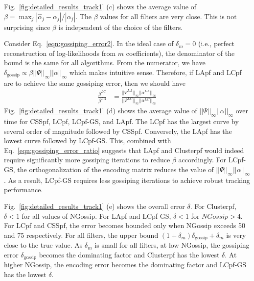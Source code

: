 \documentclass[10pt,letterpaper,final]{article}
\begin{document}
Fig.~\ref{fig:detailed_results_track1} (c) shows the average value of $\beta = \max_j|\hat{\alpha}_j-\alpha_j|/|\alpha_j|$. The $\beta$ values for all filters are very close. This is not surprising since $\beta$ is independent of the choice of the filters. 


Consider Eq.~\eqref{eqn:gossiping_error2}. In the ideal case of $\delta_m=0$ (i.e., perfect reconstruction of log-likelihoods from $m$ coefficients), the denominator of the bound is the same for all algorithms. From the numerator, we have $\delta_{\text{gossip}}\propto \beta||\Psi||_\infty||\alpha||_\infty$ which makes intuitive sense. Therefore, if LApf and LCpf are to achieve the same gossiping error, then we should have
\begin{align}
\frac{\beta^{LC}}{\beta^{LA}} &= \frac{||\Psi^{LA}||_\infty||\alpha^{LA}||_\infty}{||\Psi^{LC}||_\infty||\alpha^{LC}||_\infty}
\label{eqn:gossiping_error_ratio}
\end{align}
Fig.~\ref{fig:detailed_results_track1} (d) shows the average value of $||\Psi||_\infty||\alpha||_\infty$ over time for CSSpf, LCpf, LCpf-GS, and LApf. The LCpf has the largest curve by several order of magnitude followed by CSSpf. Conversely, the LApf has the lowest curve followed by LCpf-GS. This, combined with Eq.~\eqref{eqn:gossiping_error_ratio} suggests that LApf and Clusterpf would indeed require significantly more gossiping iterations to reduce $\beta$ accordingly. For LCpf-GS, the orthogonalization of the encoding matrix reduces the value of $||\Psi||_\infty||\alpha||_\infty$. As a result, LCpf-GS requires less gossiping iterations to achieve robust tracking performance. 

Fig.~\ref{fig:detailed_results_track1} (e) shows the overall error $\delta$. For Clusterpf, $\delta<1$ for all values of NGossip. For LApf and LCpf-GS, $\delta<1$ for $NGossip>4$. For LCpf and CSSpf, the error becomes bounded only when NGossip exceeds 50 and 75 respectively. For all filters, the upper bound $(1+\delta_m)\delta_{\text{gossip}}+\delta_m$ is very close to the true value. As $\delta_m$ is small for all filters, at low NGossip, the gossiping error $\delta_{\text{gossip}}$ becomes the dominating factor and Clusterpf has the lowest $\delta$. At higher NGossip, the encoding error becomes the dominating factor and LCpf-GS has the lowest $\delta$. 
\end{document}
